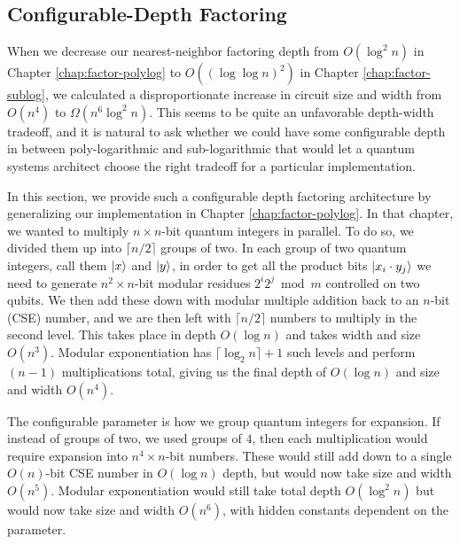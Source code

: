 
\subsection{Configurable-Depth Factoring}
\label{subsec:cohere-factor}

When we decrease our nearest-neighbor factoring depth from $O(\log^2 n)$
in Chapter \ref{chap:factor-polylog} to $O((\log\log n)^2)$ in
Chapter \ref{chap:factor-sublog}, we calculated a disproportionate
increase in circuit size and width from
$O(n^4)$ to $\Omega(n^6\log^2 n)$. This seems to be quite an
unfavorable depth-width tradeoff, and it is natural to ask whether
we could have some configurable depth in between
poly-logarithmic and sub-logarithmic that would let a quantum
systems architect choose the right tradeoff for a particular
implementation.

In this section, we provide such a configurable depth
factoring architecture by generalizing our implementation in
Chapter \ref{chap:factor-polylog}. In that chapter, we
wanted to multiply $n\times n$-bit quantum integers in parallel.
To do so, we divided them up into $\lceil n/2 \rceil$ groups of two.
In each group of two quantum integers, call them $\left\vert{x}\right\rangle$ and
$\left\vert{y}\right\rangle$, in order to get all the product bits
$\left\vert{x_i\cdot y_j}\right\rangle$ we need to generate $n^2 \times n$-bit modular residues
$2^i 2^j \bmod m$ controlled on two qubits. We then add these
down with modular multiple addition back to an $n$-bit (CSE) number,
and we are then left with $\lceil n/2 \rceil$ numbers to multiply in
the second level. This takes place in depth $O(\log n)$ and takes
width and size $O(n^3)$.
Modular exponentiation has $\lceil \log_2 n \rceil + 1$ such
levels and perform $(n-1)$ multiplications total, giving us the
final depth of $O(\log n)$ and size and width $O(n^4)$.

The configurable parameter is how we group quantum integers for
expansion. If instead of groups of two, we used groups of
$4$, then each multiplication would require expansion
into $n^4 \times n$-bit numbers. These would still add down to
a single $O(n)$-bit CSE number in $O(\log n)$ depth, but
would now take size and width $O(n^5)$. Modular exponentiation
would still take total depth $O(\log^2 n)$ but would now take
size and width $O(n^6)$, with hidden constants dependent on
the parameter.

